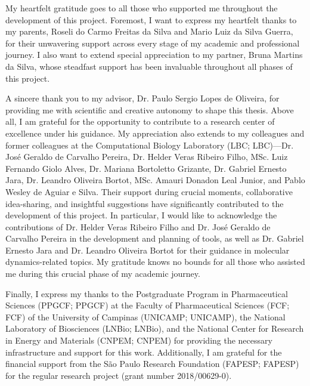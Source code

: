 \documentclass[Ingles]{phdthesis}
\begin{document}

My heartfelt gratitude goes to all those who supported me throughout the development of this project. Foremost, I want to express my heartfelt thanks to my parents, Roseli do Carmo Freitas da Silva and Mario Luiz da Silva Guerra, for their unwavering support across every stage of my academic and professional journey. I also want to extend special appreciation to my partner, Bruna Martins da Silva, whose steadfast support has been invaluable throughout all phases of this project.

A sincere thank you to my advisor, Dr. Paulo Sergio Lopes de Oliveira, for providing me with scientific and creative autonomy to shape this thesis. Above all, I am grateful for the opportunity to contribute to a research center of excellence under his guidance. My appreciation also extends to my colleagues and former colleagues at the Computational Biology Laboratory (\acs{LBC}; \acl{LBC})---Dr. José Geraldo de Carvalho Pereira, Dr. Helder Veras Ribeiro Filho, MSc. Luiz Fernando Giolo Alves, Dr. Mariana Bortoletto Grizante, Dr. Gabriel Ernesto Jara, Dr. Leandro Oliveira Bortot, MSc. Amauri Donadon Leal Junior, and Pablo Wesley de Aguiar e Silva. Their support during crucial moments, collaborative idea-sharing, and insightful suggestions have significantly contributed to the development of this project. In particular, I would like to acknowledge the contributions of Dr. Helder Veras Ribeiro Filho and Dr. José Geraldo de Carvalho Pereira in the development and planning of tools, as well as Dr. Gabriel Ernesto Jara and Dr. Leandro Oliveira Bortot for their guidance in molecular dynamics-related topics. My gratitude knows no bounds for all those who assisted me during this crucial phase of my academic journey.

Finally, I express my thanks to the Postgraduate Program in Pharmaceutical Sciences (\acs{PPGCF}; \acl{PPGCF}) at the Faculty of Pharmaceutical Sciences (\acs{FCF}; \acl{FCF}) of the University of Campinas (\acs{UNICAMP}; \acl{UNICAMP}), the National Laboratory of Biosciences (\acs{LNBio}; \acl{LNBio}), and the National Center for Research in Energy and Materials (\acs{CNPEM}; \acl{CNPEM}) for providing the necessary infrastructure and support for this work. Additionally, I am grateful for the financial support from the São Paulo Research Foundation (\acs{FAPESP}; \acl{FAPESP}) for the regular research project (grant number 2018/00629-0).
\end{document}
